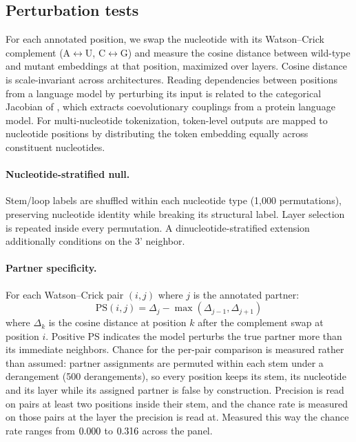 \documentclass[11pt]{article}
\begin{document}
\subsection{Perturbation tests}
\label{sec:perturbation}

For each annotated position, we swap the nucleotide with its Watson--Crick
complement (A$\leftrightarrow$U, C$\leftrightarrow$G) and measure the cosine
distance between wild-type and mutant embeddings at that position, maximized
over layers. Cosine distance is scale-invariant across architectures. Reading
dependencies between positions from a language model by perturbing its input is
related to the categorical Jacobian of \citet{zhang2024protein}, which extracts
coevolutionary couplings from a protein language model.
For multi-nucleotide tokenization, token-level outputs are mapped to
nucleotide positions by distributing the token embedding equally across
constituent nucleotides.

\paragraph{Nucleotide-stratified null.}
Stem/loop labels are shuffled within each nucleotide type (1{,}000
permutations), preserving nucleotide identity while breaking its structural
label. Layer selection is repeated inside every permutation. A
dinucleotide-stratified extension additionally conditions on the 3' neighbor.

\paragraph{Partner specificity.}
\label{sec:ps-method}
For each Watson--Crick pair $(i, j)$ where $j$ is the annotated partner:
\[
\text{PS}(i,j) = \Delta_j - \max(\Delta_{j-1}, \Delta_{j+1})
\]
where $\Delta_k$ is the cosine distance at position $k$ after the complement
swap at position $i$. Positive PS indicates the model perturbs the true
partner more than its immediate neighbors. Chance for the per-pair comparison
is measured rather than assumed: partner assignments are permuted within each
stem under a derangement (500 derangements), so every position keeps its stem,
its nucleotide and its layer while its assigned partner is false by
construction. Precision is read on pairs at least two positions inside their
stem, and the chance rate is measured on those pairs at the layer the precision
is read at. Measured this way the chance rate ranges from
$0.000{}$ to $0.316{}$ across the panel.
\end{document}
